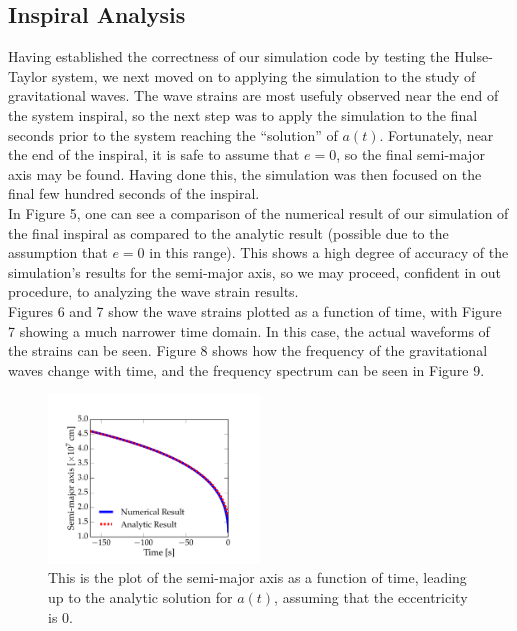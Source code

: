 \documentclass[11pt,letterpaper]{article}
\begin{document}
\subsection{Inspiral Analysis}

Having established the correctness of our simulation code by testing the Hulse-Taylor system, we next moved on to applying the simulation to the study of gravitational waves. The wave strains are most usefuly observed near the end of the system inspiral, so the next step was to apply the simulation to the final seconds prior to the system reaching the ``solution'' of $a(t)$. Fortunately, near the end of the inspiral, it is safe to assume that $e=0$, so the final semi-major axis may be found. Having done this, the simulation was then focused on the final few hundred seconds of the inspiral. \\

In Figure 5, one can see a comparison of the numerical result of our simulation of the final inspiral as compared to the analytic result (possible due to the assumption that $e=0$ in this range). This shows a high degree of accuracy of the simulation's results for the semi-major axis, so we may proceed, confident in out procedure, to analyzing the wave strain results. \\

Figures 6 and 7 show the wave strains plotted as a function of time, with Figure 7 showing a much narrower time domain. In this case, the actual waveforms of the strains can be seen. Figure 8 shows how the frequency of the gravitational waves change with time, and the frequency spectrum can be seen in Figure 9.

\begin{figure}[bth]
\centering
\includegraphics[width=0.5\textwidth]{inspiral_figs/inspiral_axs.pdf}
\caption{This is the plot of the semi-major axis as a function of time, leading up to the analytic solution for $a(t)$, assuming that the eccentricity is 0.}
\label{fig:simpleplot2}
\end{figure}
\end{document}
